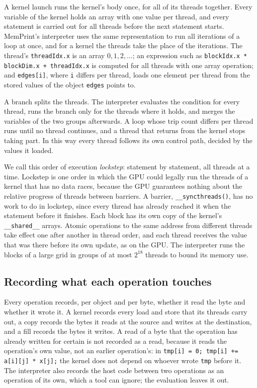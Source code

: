 \documentclass[11pt]{article}
\newcommand{\memprint}{MemPrint}
\newcommand{\term}[1]{\emph{#1}}
\newcommand{\code}[1]{\texttt{#1}}
\begin{document}
A kernel launch runs the kernel's body once, for all of its threads together. Every variable of the kernel holds
an array with one value per thread, and every statement is carried out for all threads before the next statement
starts. \memprint{}'s interpreter uses the same representation to run all iterations of a loop at once, and for a
kernel the threads take the place of the iterations. The thread's \code{threadIdx.x} is an array $0, 1, 2,
\ldots$; an expression such as \code{blockIdx.x * blockDim.x + threadIdx.x} is computed for all threads with one
array operation; and \code{edges[i]}, where \code{i} differs per thread, loads one element per thread from the
stored values of the object \code{edges} points to.

A branch splits the threads. The interpreter evaluates the condition for every thread, runs the branch only for
the threads where it holds, and merges the variables of the two groups afterwards. A loop whose trip count differs
per thread runs until no thread continues, and a thread that returns from the kernel stops taking part. In this
way every thread follows its own control path, decided by the values it loaded.

We call this order of execution \term{lockstep}: statement by statement, all threads at a time. Lockstep is one
order in which the GPU could legally run the threads of a kernel that has no data races, because the GPU guarantees
nothing about the relative progress of threads between barriers. A barrier, \code{\_\_syncthreads()}, has no work
to do in lockstep, since every thread has already reached it when the statement before it finishes. Each block has
its own copy of the kernel's \code{\_\_shared\_\_} arrays. Atomic operations to the same address from different
threads take effect one after another in thread order, and each thread receives the value that was there before
its own update, as on the GPU. The interpreter runs the blocks of a large grid in groups of at most $2^{18}$ threads
to bound its memory use.

\subsection{Recording what each operation touches}
\label{sec:events}

Every operation records, per object and per byte, whether it read the byte and whether it wrote it. A kernel
records every load and store that its threads carry out, a copy records the bytes it reads at the source and writes
at the destination, and a fill records the bytes it writes. A read of a byte that the operation has already written
for certain is not recorded as a read, because it reads the operation's own value, not an earlier operation's: in
\code{tmp[i] = 0; tmp[i] += a[i][j] * x[j];} the kernel does not depend on whoever wrote \code{tmp} before it. The
interpreter also records the host code between two operations as an operation of its own, which a tool can ignore;
the evaluation leaves it out.
\end{document}
